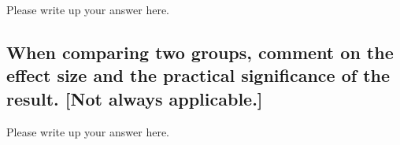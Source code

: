\documentclass[
]{book}
\begin{document}
Please write up your answer here.

\hypertarget{when-comparing-two-groups-comment-on-the-effect-size-and-the-practical-significance-of-the-result.-not-always-applicable.-1}{%
\subsection*{When comparing two groups, comment on the effect size and the practical significance of the result. {[}Not always applicable.{]}}\label{when-comparing-two-groups-comment-on-the-effect-size-and-the-practical-significance-of-the-result.-not-always-applicable.-1}}

Please write up your answer here.

  
\end{document}

